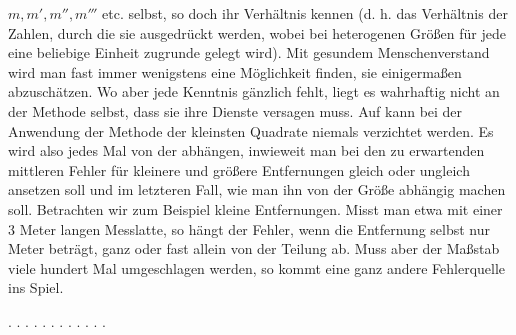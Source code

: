 $m, m', m'', m'''$ etc. selbst, so doch ihr Verhältnis kennen (d. h. das Verhältnis der Zahlen, durch die sie ausgedrückt werden, wobei bei heterogenen Größen für jede eine beliebige Einheit zugrunde gelegt wird). Mit gesundem Menschenverstand wird man fast immer wenigstens eine Möglichkeit finden, sie einigermaßen abzuschätzen. Wo aber jede Kenntnis gänzlich fehlt, liegt es wahrhaftig nicht an der Methode selbst, dass sie ihre Dienste versagen muss. Auf  kann bei der Anwendung der Methode der kleinsten Quadrate niemals verzichtet werden. Es wird also jedes Mal von der  abhängen, inwieweit man bei  den zu erwartenden mittleren Fehler für kleinere und größere Entfernungen gleich oder ungleich ansetzen soll und im letzteren Fall, wie man ihn von der Größe abhängig machen soll. Betrachten wir zum Beispiel kleine Entfernungen. Misst man etwa mit einer 3 Meter langen Messlatte, so hängt der Fehler, wenn die Entfernung selbst nur  Meter beträgt, ganz oder fast allein von der Teilung ab. Muss aber der Maßstab viele hundert Mal umgeschlagen werden, so kommt eine ganz andere Fehlerquelle ins Spiel.

\begin{center}
. . . . . . . . . . . .
\end{center}

